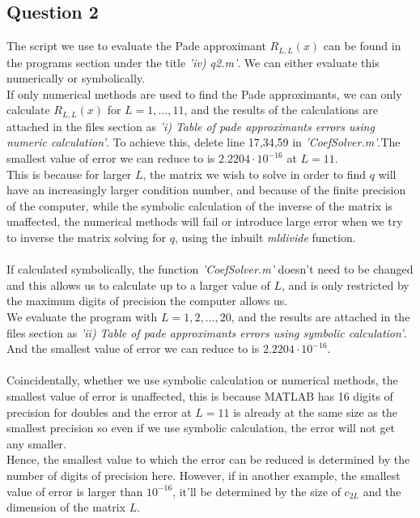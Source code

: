\documentclass[10pt]{article}
\begin{document}
\subsection*{Question 2}
The script we use to evaluate the Pade approximant $R_{L,L}(x)$ can be found in the programs section under the title \emph{'iv) q2.m'}. We can either evaluate this numerically or symbolically.\\
If only numerical methods are used to find the Pade approximants, we can only calculate $R_{L,L}(x)$ for $L=1,\dots,11$, and the results of the calculations are attached in the files section as \emph{'i) Table of pade approximants errors using numeric calculation'}. To achieve this, delete line 17,34,59 in \emph{'CoefSolver.m'}.The smallest value of error we can reduce to is \underline{$2.2204\cdot 10^{-16}$} at $L=11$.\\
This is because for larger $L$, the matrix we wish to solve in order to find $q$ will have an increasingly larger condition number, and because of the finite precision of the computer, while the symbolic calculation of the inverse of the matrix is unaffected, the numerical methods will fail or introduce large error when we try to inverse the matrix solving for $q$, using the inbuilt \textit{mldivide} function.\\\\
If calculated symbolically, the function \emph{'CoefSolver.m'} doesn't need to be changed and this allows us to calculate up to a larger value of $L$, and is only restricted by the maximum digits of precision the computer allows us.\\
We evaluate the program with $L=1,2,\dots,20$, and the results are attached in the files section as \emph{'ii) Table of pade approximants errors using symbolic calculation'}. And the smallest value of error we can reduce to is \underline{$2.2204\cdot 10^{-16}$}.\\\\
Coincidentally, whether we use symbolic calculation or numerical methods, the smallest value of error is unaffected, this is because MATLAB has 16 digits of precision for doubles and the error at $L=11$ is already at the same size as the smallest precision so even if we use symbolic calculation, the error will not get any smaller.\\
Hence, the smallest value to which the error can be reduced is determined by the number of digits of precision here. However, if in another example, the smallest value of error is larger than $10^{-16}$, it'll be determined by the size of $c_{2L}$ and the dimension of the matrix $L$.\\
\end{document}
